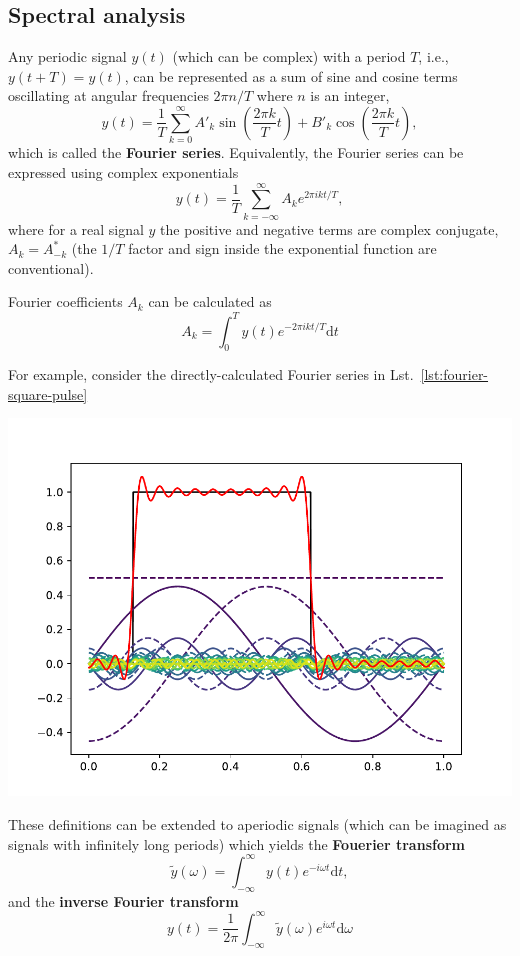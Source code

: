 \documentclass{article}
\begin{document}
\subsection{Spectral analysis}
Any periodic signal $y(t)$ (which can be complex) with a period $T$, i.e., $y(t + T) = y(t)$, can be represented as a sum of sine and cosine terms oscillating at angular frequencies $2\pi n/T$ where $n$ is an integer,
\begin{equation}
    y(t) = \frac{1}{T} \sum_{k=0}^{\infty} A'_k\sin\left(\frac{2\pi k}{T}t\right) + B'_k\cos\left(\frac{2\pi k}{T}t\right),
\end{equation}
which is called the \textbf{Fourier series}. Equivalently, the Fourier series can be expressed using complex exponentials
\begin{equation}
    y(t) = \frac{1}{T} \sum_{k=-\infty}^\infty A_k e^{2\pi ikt/T},
\end{equation}
where for a real signal $y$ the positive and negative terms are complex conjugate, $A_k = A_{-k}^*$ (the $1/T$ factor and sign inside the exponential function are conventional).

Fourier coefficients $A_k$ can be calculated as
\begin{equation}
    A_k = \int_0^T y(t) e^{-2\pi ikt/T} \mathrm{d}t
\end{equation}

For example, consider the directly-calculated Fourier series in Lst.~\ref{lst:fourier-square-pulse}

\begin{center}
    \includegraphics[width=0.5\linewidth]{fourier_series_square_pulse.pdf}
\end{center}

These definitions can be extended to aperiodic signals (which can be imagined as signals with infinitely long periods) which yields the \textbf{Fouerier transform}
\begin{equation}
    \tilde y(\omega) = \int_{-\infty}^\infty y(t)e^{-i\omega t} \mathrm{d}t,
\end{equation}
and the \textbf{inverse Fourier transform}
\begin{equation}
    y(t) = \frac{1}{2\pi}\int_{-\infty}^\infty \tilde y (\omega)e^{i\omega t}\mathrm{d}\omega
\end{equation}
\end{document}
